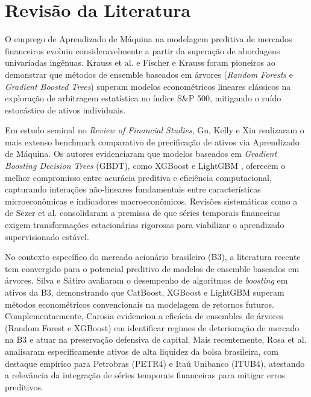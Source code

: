 \documentclass[conference]{IEEEtran}
\begin{document}
\section{Revisão da Literatura}

O emprego de Aprendizado de Máquina na modelagem preditiva de mercados financeiros evoluiu consideravelmente a partir da superação de abordagens univariadas ingênuas. Krauss et al. \cite{krauss2017deep} e Fischer e Krauss \cite{fischer2018deep} foram pioneiros ao demonstrar que métodos de ensemble baseados em árvores (\textit{Random Forests} e \textit{Gradient Boosted Trees}) superam modelos econométricos lineares clássicos na exploração de arbitragem estatística no índice S\&P 500, mitigando o ruído estocástico de ativos individuais.

Em estudo seminal no \textit{Review of Financial Studies}, Gu, Kelly e Xiu \cite{gu2020empirical} realizaram o mais extenso benchmark comparativo de precificação de ativos via Aprendizado de Máquina. Os autores evidenciaram que modelos baseados em \textit{Gradient Boosting Decision Trees} (GBDT), como XGBoost \cite{chen2016xgboost} e LightGBM \cite{ke2017lightgbm}, oferecem o melhor compromisso entre acurácia preditiva e eficiência computacional, capturando interações não-lineares fundamentais entre características microeconômicas e indicadores macroeconômicos. Revisões sistemáticas como a de Sezer et al. \cite{sezer2020financial} consolidaram a premissa de que séries temporais financeiras exigem transformações estacionárias rigorosas para viabilizar o aprendizado supervisionado estável.

No contexto específico do mercado acionário brasileiro (B3), a literatura recente tem convergido para o potencial preditivo de modelos de ensemble baseados em árvores. Silva e Sátiro \cite{silva2024poder} avaliaram o desempenho de algoritmos de \textit{boosting} em ativos da B3, demonstrando que CatBoost, XGBoost e LightGBM superam métodos econométricos convencionais na modelagem de retornos futuros. Complementarmente, Carosia \cite{carosia2023using} evidenciou a eficácia de ensembles de árvores (Random Forest e XGBoost) em identificar regimes de deterioração de mercado na B3 e atuar na preservação defensiva de capital. Mais recentemente, Rosa et al. \cite{rosa2025brazilian} analisaram especificamente ativos de alta liquidez da bolsa brasileira, com destaque empírico para Petrobras (PETR4) e Itaú Unibanco (ITUB4), atestando a relevância da integração de séries temporais financeiras para mitigar erros preditivos.
\end{document}
